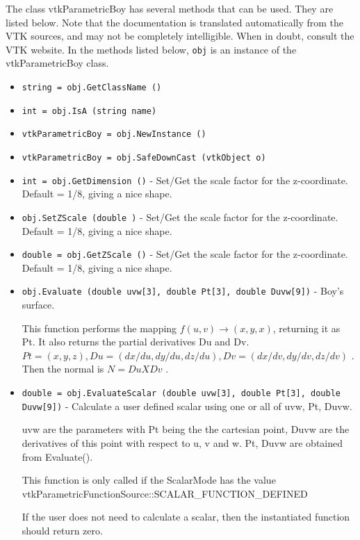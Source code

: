 The class vtkParametricBoy has several methods that can be used.
  They are listed below.
Note that the documentation is translated automatically from the VTK sources,
and may not be completely intelligible.  When in doubt, consult the VTK website.
In the methods listed below, \verb|obj| is an instance of the vtkParametricBoy class.
\begin{itemize}
\item  \verb|string = obj.GetClassName ()|

\item  \verb|int = obj.IsA (string name)|

\item  \verb|vtkParametricBoy = obj.NewInstance ()|

\item  \verb|vtkParametricBoy = obj.SafeDownCast (vtkObject o)|

\item  \verb|int = obj.GetDimension ()| -  Set/Get the scale factor for the z-coordinate. 
 Default = 1/8, giving a nice shape.

\item  \verb|obj.SetZScale (double )| -  Set/Get the scale factor for the z-coordinate. 
 Default = 1/8, giving a nice shape.

\item  \verb|double = obj.GetZScale ()| -  Set/Get the scale factor for the z-coordinate. 
 Default = 1/8, giving a nice shape.

\item  \verb|obj.Evaluate (double uvw[3], double Pt[3], double Duvw[9])| -  Boy's surface.

 This function performs the mapping $f(u,v) \rightarrow (x,y,x)$, returning it
 as Pt. It also returns the partial derivatives Du and Dv.
 $Pt = (x, y, z), Du = (dx/du, dy/du, dz/du), Dv = (dx/dv, dy/dv, dz/dv)$ .
 Then the normal is $N = Du X Dv$ .

\item  \verb|double = obj.EvaluateScalar (double uvw[3], double Pt[3], double Duvw[9])| -  Calculate a user defined scalar using one or all of uvw, Pt, Duvw.

 uvw are the parameters with Pt being the the cartesian point, 
 Duvw are the derivatives of this point with respect to u, v and w.
 Pt, Duvw are obtained from Evaluate().

 This function is only called if the ScalarMode has the value
 vtkParametricFunctionSource::SCALAR\_FUNCTION\_DEFINED

 If the user does not need to calculate a scalar, then the 
 instantiated function should return zero. 


\end{itemize}
